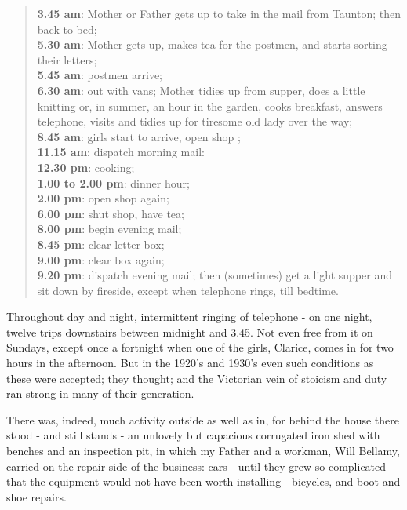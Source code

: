 \begin{quote}
\textbf{3.45 am}: Mother or Father gets up to take in the mail from Taunton; then back to bed;
\\ \textbf{5.30 am}: Mother gets up, makes tea for the postmen, and starts sorting their letters; 
\\ \textbf{5.45 am}: postmen arrive;
\\ \textbf{6.30 am}: out with vans; Mother tidies up from supper, does a little knitting or, in summer, an hour in the garden, cooks breakfast, answers telephone, visits and tidies up for tiresome old lady over the way; 
\\ \textbf{8.45 am}: girls start to arrive, open shop ;
\\ \textbf{11.15 am}: dispatch morning mail:
\\ \textbf{12.30 pm}: cooking;
\\ \textbf{1.00 to 2.00 pm}: dinner hour;
\\ \textbf{2.00 pm}: open shop again;
\\ \textbf{6.00 pm}: shut shop, have tea;
\\ \textbf{8.00 pm}: begin evening mail;
\\ \textbf{8.45 pm}: clear letter box;
\\ \textbf{9.00 pm}: clear box again;
\\ \textbf{9.20 pm}:  dispatch evening mail; then (sometimes) get a light supper and sit down by fireside, except when telephone rings, till bedtime. 
\end{quote}

Throughout day and night, intermittent ringing of telephone - on one night, twelve trips downstairs between midnight and 3.45. Not even free from it on Sundays, except once a fortnight when one of the girls, Clarice, comes in for two hours in the afternoon.
But in the 1920's and 1930's even such conditions as these were accepted;  they thought; and the Victorian vein of stoicism and duty ran strong in many of their generation.

There was, indeed, much activity outside as well as in, for behind the house there stood - and still stands - an unlovely but capacious corrugated iron shed with benches and an inspection pit, in which my Father and a workman, Will Bellamy, carried on the repair side of the business: cars - until they grew so complicated that the equipment would not have been worth installing - bicycles, and boot and shoe repairs.

